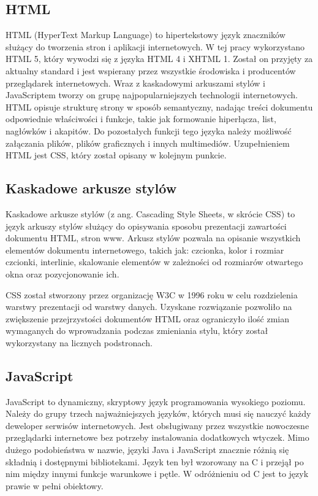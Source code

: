 \subsection{HTML}%
HTML (HyperText Markup Language) to hipertekstowy język znaczników służący do tworzenia stron i aplikacji internetowych. W tej pracy wykorzystano HTML 5, który wywodzi się z języka HTML 4 i XHTML 1. Został on przyjęty za aktualny standard i jest wspierany przez wszystkie środowiska i producentów przeglądarek internetowych. Wraz z kaskadowymi arkuszami stylów i JavaScriptem tworzy on grupę najpopularniejszych technologii internetowych. HTML opisuje strukturę strony w sposób semantyczny, nadając treści dokumentu odpowiednie właściwości i funkcje, takie jak formowanie hiperłącza, list, nagłówków i akapitów. Do pozostałych funkcji tego języka należy możliwość załączania plików, plików graficznych i innych multimediów. Uzupełnieniem HTML jest CSS, który został opisany w kolejnym punkcie.

\subsection{Kaskadowe arkusze stylów}%
Kaskadowe arkusze stylów (z ang. Cascading Style Sheets, w skrócie CSS) to język arkuszy stylów służący  do opisywania sposobu prezentacji zawartości dokumentu HTML, stron www. 
Arkusz stylów pozwala na opisanie wszystkich elementów dokumentu internetowego, takich jak: czcionka, kolor i rozmiar czcionki, interlinie, skalowanie elementów w zależności od rozmiarów otwartego okna oraz pozycjonowanie ich.

CSS został stworzony przez organizację W3C w 1996 roku w celu rozdzielenia warstwy prezentacji od warstwy danych. Uzyskane rozwiązanie pozwoliło na zwiększenie przejrzystości dokumentów HTML oraz ograniczyło ilość zmian wymaganych do wprowadzania podczas zmieniania stylu, który został wykorzystany na licznych podstronach.

\subsection{JavaScript}%
JavaScript to dynamiczny, skryptowy język programowania wysokiego poziomu. Należy do grupy trzech najważniejszych języków, których musi się nauczyć każdy deweloper serwisów internetowych. Jest obsługiwany przez wszystkie nowoczesne przeglądarki internetowe bez potrzeby instalowania dodatkowych wtyczek. Mimo dużego podobieństwa w nazwie, języki Java i JavaScript znacznie różnią się składnią i dostępnymi bibliotekami. Język ten był wzorowany na C i przejął po nim między innymi funkcje warunkowe i pętle. W odróżnieniu od C jest to język prawie w pełni obiektowy.


